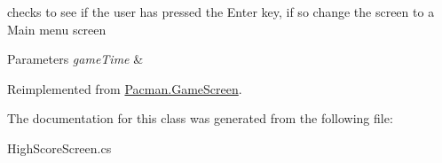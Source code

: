 checks to see if the user has pressed the Enter key, if so change the screen to a Main menu screen 


\begin{DoxyParams}{Parameters}
{\em game\-Time} & \\
\hline
\end{DoxyParams}


Reimplemented from \hyperlink{class_pacman_1_1_game_screen_a768b26cbc3ed823d0dcba5055ae9a8b4}{Pacman.\-Game\-Screen}.



The documentation for this class was generated from the following file\-:\begin{DoxyCompactItemize}
\item 
High\-Score\-Screen.\-cs\end{DoxyCompactItemize}
